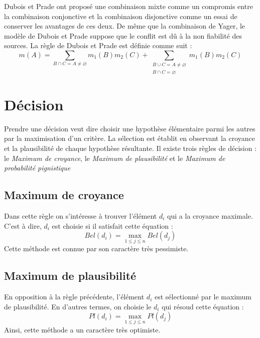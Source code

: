 Dubois et Prade ont proposé une combinaison mixte comme un compromis entre la
combinaison conjonctive et la combinaison disjonctive comme un essai de conserver
les avantages de ces deux. De même que la combinaison de  Yager, le modèle de Dubois
et Prade suppose que le conflit est dû à la non fiabilité des sources. La règle de
Dubois et Prade est définie comme suit :
\begin{equation}
m(A) = \sum_{B \cap C = A \neq \varnothing} m_1(B) m_2(C) +
\sum_{\substack{B \cup C = A \neq \varnothing \\ B \cap C = \varnothing}} m_1(B) m_2(C)
\end{equation}

\section{Décision}

Prendre une décision veut dire choisir une hypothèse élémentaire parmi les autres
par la maximisation d'un critère. La sélection est établit en observant
la croyance et la plausibilité de chaque hypothèse résultante. Il existe trois règles
de décision : le \emph{Maximum de croyance}, le \emph{Maximum de plausibilité} et le
\emph{Maximum de probabilité pignistique}

\subsection{Maximum de croyance}

Dans cette règle on s'intéresse à trouver l'élément $d_i$ qui a la croyance maximale.
C'est à dire, $d_i$ est choisie si il satisfait cette équation :
\begin{equation}
Bel(d_i) = \max_{1 \leq j \leq n} Bel(d_j)
\end{equation}
Cette méthode est connue par son caractère très pessimiste.

\subsection{Maximum de plausibilité}

En opposition à la règle précédente, l'élément $d_i$ est sélectionné par le maximum
de plausibilité. En d'autres termes, on choisie le $d_i$ qui résoud cette équation :
\begin{equation}
Pl(d_i) = \max_{1 \leq j \leq n} Pl(d_j)
\end{equation}
Ainsi, cette méthode a un caractère très optimiste.